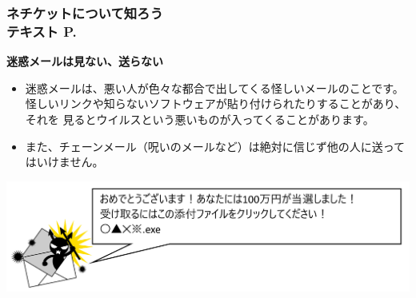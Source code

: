 \begin{frame}[fragile]
    \frametitle{ネチケットについて知ろう\\テキスト P.\pageref{1:P:Netiquette}~~~}
    \large\textbf{迷惑メールは見ない、送らない}
            \begin{itemize}\small
                \item 迷惑メールは、悪い人が色々な都合で出してくる怪しいメールのことです。
                怪しいリンクや知らないソフトウェアが貼り付けられたりすることがあり、それを
                見るとウイルスという悪いものが入ってくることがあります。
                \item また、チェーンメール（呪いのメールなど）は絶対に信じず他の人に送ってはいけません。         
            \end{itemize}
            \vfill
            
			\begin{minipage}{\textwidth}
                {\upshape
                  \includegraphics[width=\textwidth]{slide07-img/slide07-img006.png}}
            \end{minipage}
\end{frame}

